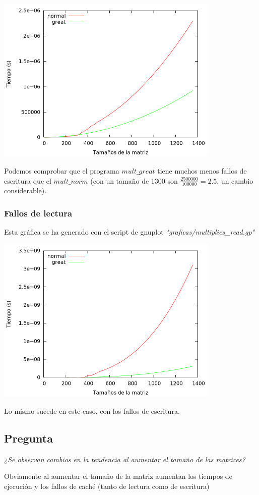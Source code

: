 \documentclass[nochap]{apuntes}
\begin{document}
\begin{center}
\includegraphics[width=0.8\textwidth]{graficas/fotos/multiplies_write.png}
\end{center}

Podemos comprobar que el programa $mult\_great$ tiene muchos menos fallos de escritura que el $mult\_norm$ (con un tamaño de 1300 son $\displaystyle \frac{2500000}{100000} = 2.5$, un cambio considerable).

\subsubsection{Fallos de lectura}

Esta gráfica se ha generado con el script de gnuplot \emph{"graficas/multiplies\_read.gp"}

\begin{center}
\includegraphics[width=0.8\textwidth]{graficas/fotos/multiplies_read.png}
\end{center}

Lo mismo sucede en este caso, con los fallos de escritura.

\subsection{Pregunta}\emph{¿Se observan cambios en la tendencia al aumentar el tamaño de las matrices?}

Obviamente al aumentar el tamaño de la matriz aumentan los tiempos de ejecución y los fallos de caché (tanto de lectura como de escritura)

 
\end{document}
